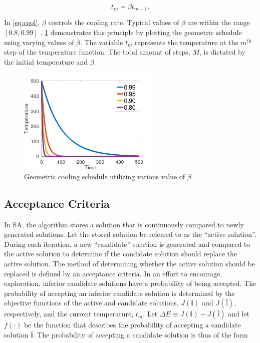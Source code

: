 \documentclass[energies,article,submit,moreauthors]{Definitions/mdpi}
\newcommand{\I}{\mathbb{I}}                 %
\begin{document}
\begin{equation}
\label{eq:cool}
t_m = \beta t_{m-1}\text{.}
\end{equation}

In \ref{eq:cool}, \(\beta\) controls the cooling rate. Typical values of \(\beta\) are within the range \([0.8, 0.99]\)
\cite{henderson-1989-theor-pract}. \ref{fig:geometric} demonstrates this principle by plotting the geometric schedule
using varying values of \(\beta\). The variable \(t_m\) represents the temperature at the \(m^{\text{th}}\) step of the
temperature function. The total amount of steps, \(M\), is dictated by the initial temperature and \(\beta\).

\begin{figure}[t!]
  \centering \includegraphics[width=0.6\textwidth]{img/geometric.png}
  \caption{Geometric cooling schedule utilizing various value of $\beta$.}
  \label{fig:geometric}
\end{figure}

\subsection{Acceptance Criteria}
\label{sec:sa-acceptance}
In SA, the algorithm stores a solution that is continuously compared to newly generated solutions. Let the stored
solution be referred to as the ``active solution''. During each iteration, a new ``candidate'' solution is generated and
compared to the active solution to determine if the candidate solution should replace the active solution. The method of
determining whether the active solution should be replaced is defined by an acceptance criteria. In an effort to
encourage exploration, inferior candidate solutions have a probability of being accepted. The probability of accepting
an inferior candidate solution is determined by the objective functions of the active and candidate solutions, \(J(\I)\)
and \(J(\bar{\I})\), respectively, and the current temperature, \(t_m\). Let \(\Delta E \equiv J(\I) - J(\bar{\I})\) and let \(f(\cdot)\) be
the function that describes the probability of accepting a candidate solution \(\bar{\I}\). The probability of accepting a
candidate solution is thus of the form \cite{keller-2019-multi-objec}
\end{document}
